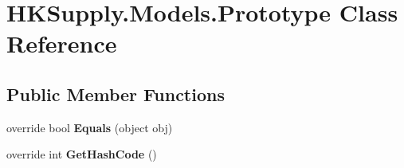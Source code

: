 \hypertarget{class_h_k_supply_1_1_models_1_1_prototype}{}\section{H\+K\+Supply.\+Models.\+Prototype Class Reference}
\label{class_h_k_supply_1_1_models_1_1_prototype}
\subsection*{Public Member Functions}
\begin{DoxyCompactItemize}
\item 
\mbox{\label{class_h_k_supply_1_1_models_1_1_prototype_ac83e059c81033516bf1b7173c73a2947}} 
override bool {\bfseries Equals} (object obj)
\item 
\mbox{\label{class_h_k_supply_1_1_models_1_1_prototype_a6e4439839a55764c2eadc7ea2304186d}} 
override int {\bfseries Get\+Hash\+Code} ()
\end{DoxyCompactItemize}

